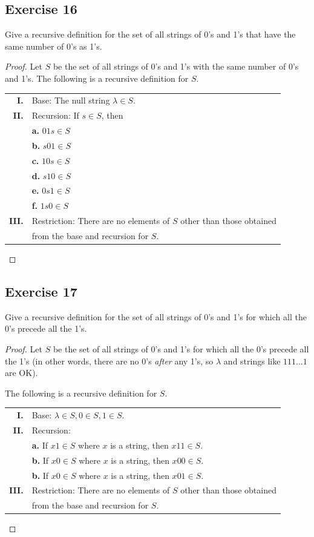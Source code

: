 \documentclass[14pt]{extarticle}
\begin{document}
\subsection{Exercise 16}
Give a recursive definition for the set of all strings of 0’s and 1’s that have the same number of 0’s as 1’s.

\begin{proof}
Let $S$ be the set of all strings of 0’s and 1’s with the
same number of 0’s and 1’s. 
The following is a recursive definition for $S$.

\begin{tabular}{rl}
{\bf I.}  & Base: The null string $\lambda \in S$. \\
{\bf II.} & Recursion: If $s \in S$, then \\
& {\bf a.} $01s \in S$ \\
& {\bf b.} $s01 \in S$ \\
& {\bf c.} $10s \in S$ \\
& {\bf d.} $s10 \in S$ \\
& {\bf e.} $0s1 \in S$ \\
& {\bf f.} $1s0 \in S$ \\
{\bf III.} & Restriction: There are no elements of $S$ other than those obtained \\
& from the base and recursion for $S$.
\end{tabular}
\end{proof}

\subsection{Exercise 17}
Give a recursive definition for the set of all strings of 0’s and 1’s for which all the 0’s precede all the 1’s.

\begin{proof}
Let $S$ be the set of all strings of 0’s and 1’s for which all the 0’s precede all the 1’s (in other words, there are 
no 0's {\it after} any 1's, so $\lambda$ and strings like $111\ldots 1$ are OK).

The following is a recursive definition for $S$.

\begin{tabular}{rl}
{\bf I.}  & Base: \(\lambda \in S, 0 \in S, 1 \in S\). \\
{\bf II.} & Recursion: \\
& {\bf a.} If $x1 \in S$ where $x$ is a string, then $x11 \in S$. \\
& {\bf b.} If $x0 \in S$ where $x$ is a string, then $x00 \in S$. \\
& {\bf b.} If $x0 \in S$ where $x$ is a string, then $x01 \in S$. \\
{\bf III.} & Restriction: There are no elements of $S$ other than those obtained \\
& from the base and recursion for $S$.
\end{tabular}
\end{proof}
\end{document}
